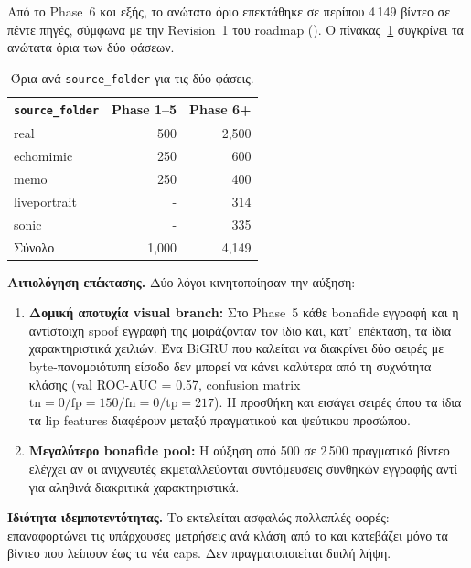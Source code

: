 Από το Phase~6 και εξής, το ανώτατο όριο επεκτάθηκε σε περίπου 4\,149 βίντεο
σε πέντε πηγές, σύμφωνα με την Revision~1 του roadmap
().
Ο πίνακας~\ref{tab:caps} συγκρίνει τα ανώτατα όρια των δύο φάσεων.

\begin{table}[ht]
  \centering
  \begin{tabular}{lrr}
    \toprule
    \texttt{source\_folder} & Phase 1–5 & Phase 6+ \\
    \midrule
    real         & 500 & 2{,}500 \\
    echomimic    & 250 &   600 \\
    memo         & 250 &   400 \\
    liveportrait &   - &   314 \\
    sonic        &   - &   335 \\
    \midrule
    Σύνολο       & 1{,}000 & 4{,}149 \\
    \bottomrule
  \end{tabular}
  \caption{Όρια ανά \texttt{source\_folder} για τις δύο φάσεις.}
  \label{tab:caps}
\end{table}

\textbf{Αιτιολόγηση επέκτασης.} Δύο λόγοι κινητοποίησαν την αύξηση:

\begin{enumerate}
  \item \textbf{Δομική αποτυχία visual branch:} Στο Phase~5 κάθε bonafide
    εγγραφή και η αντίστοιχη spoof εγγραφή της μοιράζονταν
    τον ίδιο  και, κατ'~επέκταση,
    τα ίδια  χαρακτηριστικά χειλιών.
    Ένα BiGRU που καλείται να διακρίνει δύο σειρές με
    byte-πανομοιότυπη είσοδο δεν μπορεί να κάνει καλύτερα
    από τη συχνότητα κλάσης (val ROC-AUC = 0.57,
    confusion matrix $\mathrm{tn}=0 / \mathrm{fp}=150 / \mathrm{fn}=0 / \mathrm{tp}=217$).
    Η προσθήκη  και  εισάγει
    σειρές όπου τα ίδια τα lip features διαφέρουν μεταξύ
    πραγματικού και ψεύτικου προσώπου.
  \item \textbf{Μεγαλύτερο bonafide pool:} Η αύξηση από 500 σε 2\,500
    πραγματικά βίντεο ελέγχει αν οι ανιχνευτές εκμεταλλεύονται
    συντόμευσεις συνθηκών εγγραφής αντί για αληθινά
    διακριτικά χαρακτηριστικά.
\end{enumerate}

\textbf{Ιδιότητα ιδεμποτεντότητας.} Το 
εκτελείται ασφαλώς πολλαπλές φορές: επαναφορτώνει τις
υπάρχουσες μετρήσεις ανά κλάση από το 
και κατεβάζει μόνο τα βίντεο που λείπουν έως τα νέα caps.
Δεν πραγματοποιείται διπλή λήψη.

